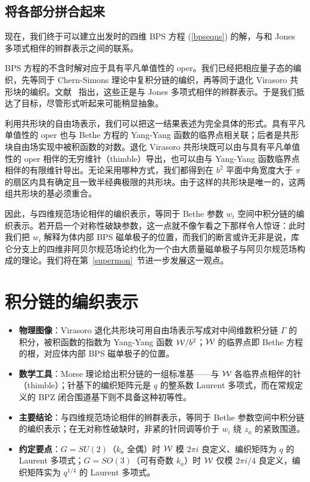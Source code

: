 \subsection{将各部分拼合起来}\label{punchline}
现在，我们终于可以建立出发时的四维 BPS 方程 (\ref{bpseqns}) 的解，与和 Jones 多项式相伴的辫群表示之间的联系。

BPS 方程的不含时解对应于具有平凡单值性的 oper。我们已经把相应量子态的编织，先等同于 Chern-Simons 理论中复积分链的编织，再等同于退化 Virasoro 共形块的编织。文献~\cite{Lawrence,SV} 指出，这些正是与 Jones 多项式相伴的辫群表示。于是我们抵达了目标，尽管形式听起来可能稍显抽象。

利用共形块的自由场表示，我们可以把这一结果表述为完全具体的形式。具有平凡单值性的 oper 也与 Bethe 方程的 Yang-Yang 函数的临界点相关联；后者是共形块自由场实现中被积函数的对数。退化 Virasoro 共形块既可以由与具有平凡单值性的 oper 相伴的无穷维针（thimble）导出，也可以由与 Yang-Yang 函数临界点相伴的有限维针导出。无论采用哪种方式，我们都得到在 $b^2$ 平面中角宽度大于 $\pi$ 的扇区内具有确定且一致半经典极限的共形块。由于这样的共形块是唯一的，这两组共形块的基必须重合。

因此，与四维规范场论相伴的编织表示，等同于 Bethe 参数 $w_i$ 空间中积分链的编织表示。若开启一个对称性破缺参数，这一点就不像乍看之下那样令人惊讶：此时我们把 $w_i$ 解释为体内部 BPS 磁单极子的位置，而我们的断言或许无非是说，库仑分支上的四维非阿贝尔规范场论约化为一个由大质量磁单极子与阿贝尔规范场构成的理论。我们将在第~\ref{supermon}~节进一步发展这一观点。

\section{积分链的编织表示}\label{brrep}

\begin{keytakeaways}
\begin{itemize}\setlength{\itemsep}{2pt}
  \item \textbf{物理图像}：Virasoro 退化共形块可用自由场表示写成对中间维数积分链 $\Gamma$ 的积分，被积函数的指数为 Yang-Yang 函数 ${\mathcal W}/b^2$；${\mathcal W}$ 的临界点即 Bethe 方程的根，对应体内部 BPS 磁单极子的位置。
  \item \textbf{数学工具}：Morse 理论给出积分链的一组标准基——与 ${\mathcal W}$ 各临界点相伴的针（thimble）；针基下的编织矩阵元是 $q$ 的整系数 Laurent 多项式，而在常规定义的 BPZ 闭合围道基下则不具备这种初等性。
  \item \textbf{主要结论}：与四维规范场论相伴的辫群表示，等同于 Bethe 参数空间中积分链的编织表示；在无对称性破缺时，非紧的针同调等价于 $w_i$ 绕 $z_a$ 的紧致围道。
  \item \textbf{约定要点}：$G=SU(2)$（$k_a$ 全偶）时 ${\mathcal W}$ 模 $2\pi i$ 良定义、编织矩阵为 $q$ 的 Laurent 多项式；$G=SO(3)$（可有奇数 $k_a$）时 ${\mathcal W}$ 仅模 $2\pi i/4$ 良定义，编织矩阵实为 $q^{1/4}$ 的 Laurent 多项式。
\end{itemize}
\end{keytakeaways}

